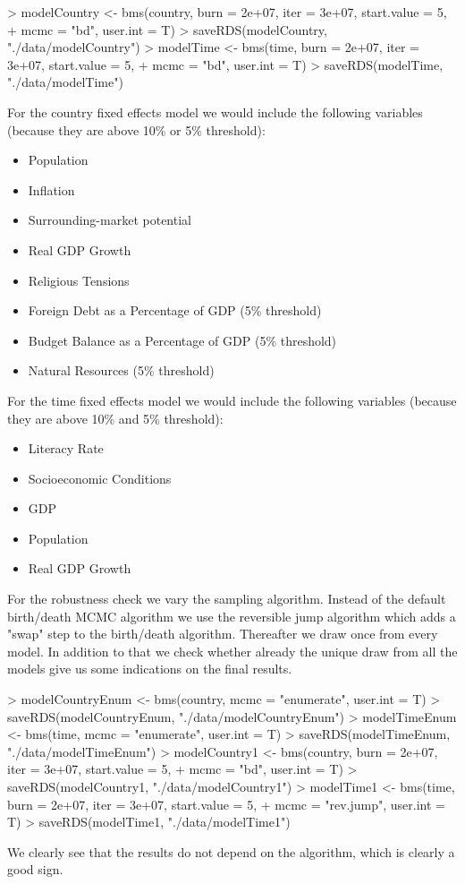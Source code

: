 \documentclass{article}
\begin{document}
\begin{Schunk}
\begin{Sinput}
> modelCountry <- bms(country, burn = 2e+07, iter = 3e+07, start.value = 5, 
+     mcmc = "bd", user.int = T)
> saveRDS(modelCountry, "./data/modelCountry")
> modelTime <- bms(time, burn = 2e+07, iter = 3e+07, start.value = 5, 
+     mcmc = "bd", user.int = T)
> saveRDS(modelTime, "./data/modelTime")
\end{Sinput}
\end{Schunk}
For the country fixed effects model we would include the following variables (because they are above 10\% or 5\% threshold):
\begin{itemize}
\item Population
\item Inflation
\item Surrounding-market potential
\item Real GDP Growth
\item Religious Tensions
\item Foreign Debt as a Percentage of GDP (5\% threshold)
\item Budget Balance as a Percentage of GDP (5\% threshold)
\item Natural Resources (5\% threshold)
\end{itemize}

For the time fixed effects model we would include the following variables (because they are above 10\% and 5\% threshold):
\begin{itemize}
\item Literacy Rate
\item Socioeconomic Conditions
\item GDP
\item Population
\item Real GDP Growth
\end{itemize}

For the robustness check we vary the sampling algorithm. Instead of the default birth/death MCMC algorithm we use the reversible jump algorithm which adds a "swap" step to the birth/death algorithm. Thereafter we draw once from every model. In addition to that we check whether already the unique draw from all the models give us some indications on the final results.
\begin{Schunk}
\begin{Sinput}
> modelCountryEnum <- bms(country, mcmc = "enumerate", user.int = T)
> saveRDS(modelCountryEnum, "./data/modelCountryEnum")
> modelTimeEnum <- bms(time, mcmc = "enumerate", user.int = T)
> saveRDS(modelTimeEnum, "./data/modelTimeEnum")
> modelCountry1 <- bms(country, burn = 2e+07, iter = 3e+07, start.value = 5, 
+     mcmc = "bd", user.int = T)
> saveRDS(modelCountry1, "./data/modelCountry1")
> modelTime1 <- bms(time, burn = 2e+07, iter = 3e+07, start.value = 5, 
+     mcmc = "rev.jump", user.int = T)
> saveRDS(modelTime1, "./data/modelTime1")
\end{Sinput}
\end{Schunk}
We clearly see that the results do not depend on the algorithm, which is clearly a good sign. 
\end{document}
